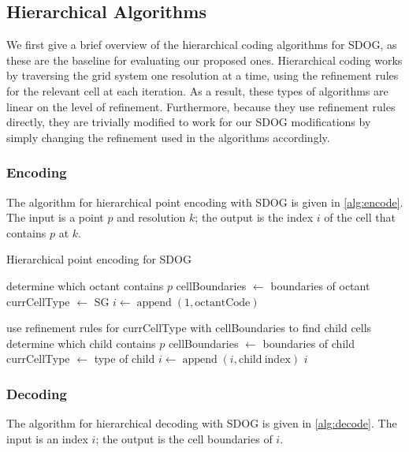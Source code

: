 \subsection{Hierarchical Algorithms}
We first give a brief overview of the hierarchical coding algorithms for SDOG, as these are the baseline for evaluating our proposed ones.
Hierarchical coding works by traversing the grid system one resolution at a time, using the refinement rules for the relevant cell at each iteration.
As a result, these types of algorithms are linear on the level of refinement.
Furthermore, because they use refinement rules directly, they are trivially modified to work for our SDOG modifications by simply changing the refinement used in the algorithms accordingly.


\subsubsection{Encoding}
The algorithm for hierarchical point encoding with SDOG is given in \cref{alg:encode}.
The input is a point $p$ and resolution $k$; the output is the index $i$ of the cell that contains $p$ at $k$.


\begin{algorithm}
	\caption{Hierarchical point encoding for SDOG}
	
	\begin{algorithmic}
		
		\STATE determine which octant contains $p$
		\STATE cellBoundaries $\leftarrow$ boundaries of octant
		\STATE currCellType $\leftarrow$ SG
		\STATE $i \leftarrow \operatorname{append}(1, \mathrm{octantCode})$
		
		\STATE use refinement rules for currCellType with cellBoundaries to find child cells
		\STATE determine which child contains $p$
		\STATE cellBoundaries $\leftarrow$ boundaries of child
		\STATE currCellType $\leftarrow$ type of child
		\STATE $i \leftarrow \operatorname{append}(i, \mathrm{child~index})$
		\ENDFOR
		\RETURN $i$
		
	\end{algorithmic}
	\label{alg:encode}
\end{algorithm}


\subsubsection{Decoding}
The algorithm for hierarchical decoding with SDOG is given in \cref{alg:decode}.
The input is an index $i$; the output is the cell boundaries of $i$.



